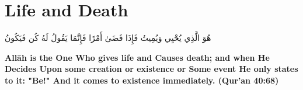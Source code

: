 \chapter{Life and Death}
\begin{center}
    {\Huge    
        \begin{Arabic}
            هُوَ الَّذِي يُحْيِي وَيُمِيتُ فَإِذَا قَضَىٰ أَمْرًا فَإِنَّمَا يَقُولُ لَهُ كُن فَيَكُونُ
        \end{Arabic}
    }
\end{center}
\vspace*{\fill}
\vspace{3cm}
\begin{center}
    \large \textbf{Allāh is the One Who gives life and Causes death; and when He Decides Upon some creation or existence or Some event He only states to it: "Be!" And it comes to existence immediately. (Qur'an 40:68)}
\end{center}
